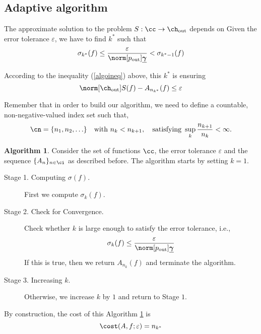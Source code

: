 \documentclass[final]{elsarticle}
\newcommand{\chout}{\ch_{\text{\rm{out}}}}
\newcommand{\pout}{p_{\text{\rm{out}}}}
\newcommand{\bgamma}{\underline{\boldsymbol\gamma}}
\theoremstyle{definition}
\newtheorem{algo}{Algorithm}
\theoremstyle{remark}
\begin{document}
\subsection{Adaptive algorithm}

The approximate solution to the problem $S:\cc\rightarrow\chout$ depends on
Given the error tolerance $\varepsilon$, we have to find $k^*$ such that
\begin{equation*}
         \sigma_{k^*}(f) \le \frac{\varepsilon}{\norm[\pout]{\bgamma}} < \sigma_{k^*-1}(f)
\end{equation*}

According to the inequality (\ref{algoineq}) above, this $k^*$ is ensuring
\begin{equation*}
\norm[\chout]{S(f)-A_{n_{k^*}}(f)} \le \varepsilon
\end{equation*}

Remember that in order to build our algorithm, we need to define a countable, non-negative-valued index set such that,
\begin{equation} \label{indexdef}
\cn=\{n_1, n_2, \ldots\} \quad \text{with } n_k < n_{k+1}, \quad \text{satisfying } \sup_k \frac{n_{k+1}}{n_k} <\infty.
\end{equation}

\begin{algo}\label{algo2}
 Consider the set of functions $\cc$, the error tolerance $\varepsilon$ and the sequence $\{A_n\}_{n \in \ci}$ as described before.
The algorithm starts by setting $k=1$.
\begin{description}
\item[Stage 1. Computing $\sigma(f)$.] First we compute $\sigma_{k}(f)$.
\item[Stage 2. Check for Convergence.] Check whether $k$ is large enough to satisfy the error tolerance, i.e.,
    \begin{equation}
          \sigma_{k}(f) \le \frac{\varepsilon}{\norm[\pout]{\bgamma}}
    \end{equation}
    If this is true, then we return $A_{n_{k}}(f)$ and terminate the algorithm.
\item[Stage 3. Increasing $k$.] Otherwise, we increase $k$ by $1$ and return to Stage $1$.
\end{description}
\end{algo}

 By construction, the cost of this Algorithm \ref{algo2} is
\begin{equation}\label{costalgo}
\cost(A,f;\varepsilon)=n_{k^*}
\end{equation}
\end{document}
